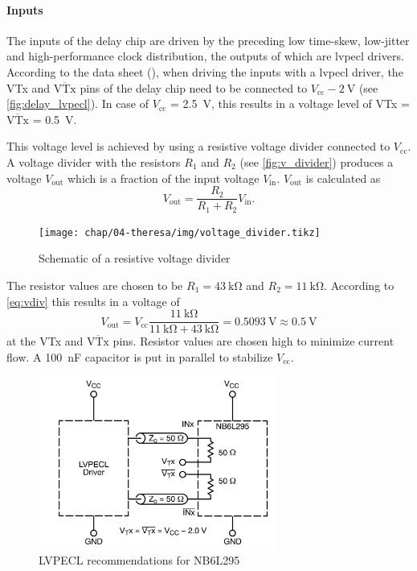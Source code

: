 \paragraph{Inputs}
The inputs of the delay chip are driven by the preceding low time-skew, low-jitter and high-performance clock distribution, the outputs of which are \gls{lvpecl} drivers.
According to the data sheet (\cite{NB6L295}), when driving the inputs with a \gls{lvpecl} driver, the VTx and $\overline{\text{VTx}}$ pins of the delay chip need to be connected to $V_\text{cc} - \SI{2}{\volt}$ (see \autoref{fig:delay_lvpecl}).
In case of $V_\text{cc}$ = \SI{2.5}{\volt}, this results in a voltage level of VTx = $\overline{\text{VTx}}$ = \SI{0.5}{\volt}.

This voltage level is achieved by using a resistive voltage divider connected to $V_\text{cc}$. 
A voltage divider with the resistors $R_1$ and $R_2$ (see \autoref{fig:v_divider}) produces a voltage $V_\text{out}$ which is a fraction of the input voltage $V_\text{in}$.
$V_\text{out}$ is calculated as
\begin{equation}\label{eq:vdiv}
	V_\text{out} = \frac{R_2}{R_1 + R_2} V_\text{in}.
\end{equation}
\begin{figure}[tb]
	\centering
	\texttt{[image: chap/04-theresa/img/voltage\_divider.tikz]}
	\caption{Schematic of a resistive voltage divider}
	\label{fig:v_divider}
\end{figure}
The resistor values are chosen to be $R_1 = \SI{43}{\kilo\ohm}$ and $R_2 = \SI{11}{\kilo\ohm}$.
According to \autoref{eq:vdiv} this results in a voltage of
\begin{equation}
	V_\text{out} = V_\text{cc} \frac{\SI{11}{\kilo\ohm}}{\SI{11}{\kilo\ohm} + \SI{43}{\kilo\ohm}} = \SI{0.5093}{\volt} \approx \SI{0.5}{\volt}
\end{equation}
at the VTx and $\overline{\text{VTx}}$ pins.
Resistor values are chosen high to minimize current flow.
A \SI{100}{\nano\farad} capacitor is put in parallel to stabilize $V_\text{cc}$.

\begin{figure}[tb]
	\centering
	\includegraphics[width = 0.7\textwidth]{chap/04-theresa/img/delay_lvpecl}
	\caption[NB6L295 Delay Chip Schematic]{LVPECL recommendations for NB6L295 \cite{NB6L295}}
	\label{fig:delay_lvpecl}
\end{figure}


